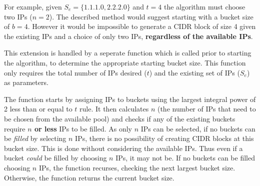 \begin{appendices}
For example, given $S_e = \{1.1.1.0, 2.2.2.0\}$ and $t = 4$ the algorithm must choose two IPs ($n = 2$). The described method would suggest starting with a bucket size of $b=4$. However it would be impossible to generate a CIDR block of size 4 given the existing IPs and a choice of only two IPs, \textbf{regardless of the available IPs}. 

This extension is handled by a seperate function which is called prior to starting the algorithm, to determine the appropriate starting bucket size. This function only requires the total number of IPs desired ($t$) and the existing set of IPs ($S_e$) as parameters. 

The function starts by assigning IPs to buckets using the largest integral power of 2 less than or equal to $t$ rule. It then calculates $n$ (the number of IPs that need to be chosen from the available pool) and checks if any of the existing buckets require \textbf{$n$ or less} IPs to be filled. As only $n$ IPs can be selected, if no buckets can be \textit{filled} by selecting $n$ IPs, there is no possibility of creating CIDR blocks at this bucket size. This is done without considering the available IPs. Thus even if a bucket \textit{could} be filled by choosing $n$ IPs, it may not be. If no buckets can be filled choosing $n$ IPs, the function recurses, checking the next largest bucket size. Otherwise, the function returns the current bucket size.



\end{appendices}